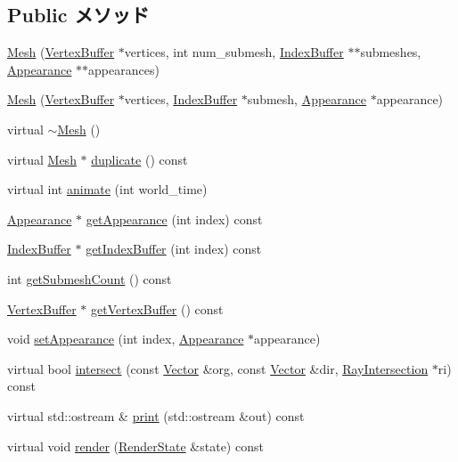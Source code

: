 \subsection*{Public メソッド}
\begin{CompactItemize}
\item 
\hyperlink{classm3g_1_1Mesh_f2c80c243fdcd32b07c77d2ab3d565ab}{Mesh} (\hyperlink{classm3g_1_1VertexBuffer}{VertexBuffer} $\ast$vertices, int num\_\-submesh, \hyperlink{classm3g_1_1IndexBuffer}{IndexBuffer} $\ast$$\ast$submeshes, \hyperlink{classm3g_1_1Appearance}{Appearance} $\ast$$\ast$appearances)
\item 
\hyperlink{classm3g_1_1Mesh_2d7766ebbb63eccd77d0dd8b53b400a3}{Mesh} (\hyperlink{classm3g_1_1VertexBuffer}{VertexBuffer} $\ast$vertices, \hyperlink{classm3g_1_1IndexBuffer}{IndexBuffer} $\ast$submesh, \hyperlink{classm3g_1_1Appearance}{Appearance} $\ast$appearance)
\item 
virtual \hyperlink{classm3g_1_1Mesh_6e26384cfb03023e7dc2e5419baf813f}{$\sim$Mesh} ()
\item 
virtual \hyperlink{classm3g_1_1Mesh}{Mesh} $\ast$ \hyperlink{classm3g_1_1Mesh_52ce6d0b3eda2bd3a95bfb5b7dbb6f82}{duplicate} () const 
\item 
virtual int \hyperlink{classm3g_1_1Mesh_8aad1ceab4c2a03609c8a42324ce484d}{animate} (int world\_\-time)
\item 
\hyperlink{classm3g_1_1Appearance}{Appearance} $\ast$ \hyperlink{classm3g_1_1Mesh_4950a19e02c022dcf41a086117eb8219}{getAppearance} (int index) const 
\item 
\hyperlink{classm3g_1_1IndexBuffer}{IndexBuffer} $\ast$ \hyperlink{classm3g_1_1Mesh_ca34a663f46ce20e2b894c046714ea1d}{getIndexBuffer} (int index) const 
\item 
int \hyperlink{classm3g_1_1Mesh_5dc5a57ad549eb97504c2a1280a882dd}{getSubmeshCount} () const 
\item 
\hyperlink{classm3g_1_1VertexBuffer}{VertexBuffer} $\ast$ \hyperlink{classm3g_1_1Mesh_7602e9bf450fa8b3ec3c60e2e88cba25}{getVertexBuffer} () const 
\item 
void \hyperlink{classm3g_1_1Mesh_bb03b872c453c4f8f3fe31e8b54d1b52}{setAppearance} (int index, \hyperlink{classm3g_1_1Appearance}{Appearance} $\ast$appearance)
\item 
virtual bool \hyperlink{classm3g_1_1Mesh_dc812d8230f94f0b6b8e4fecdb802a16}{intersect} (const \hyperlink{classm3g_1_1Vector}{Vector} \&org, const \hyperlink{classm3g_1_1Vector}{Vector} \&dir, \hyperlink{classm3g_1_1RayIntersection}{RayIntersection} $\ast$ri) const 
\item 
virtual std::ostream \& \hyperlink{classm3g_1_1Mesh_6fea17fa1532df3794f8cb39cb4f911f}{print} (std::ostream \&out) const 
\item 
virtual void \hyperlink{classm3g_1_1Mesh_8babc8a79b78615da51161e94029eea9}{render} (\hyperlink{structm3g_1_1RenderState}{RenderState} \&state) const 
\end{CompactItemize}
